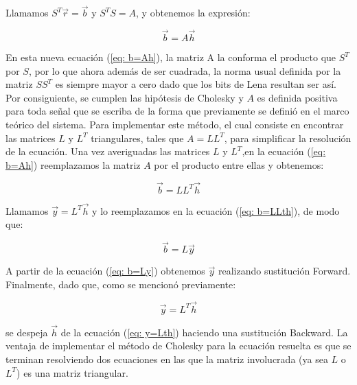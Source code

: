 Llamamos  $S^T \vec{r} = \vec{b}$ y  $S^T S = A$, y obtenemos la expresi\'on:

\begin{equation} 
\vec{b} = A \vec{h} 
\label{eq: b=Ah} 
\end{equation} 

En esta nueva ecuaci\'on (\ref{eq: b=Ah}), la matriz A la conforma el producto que $S^T$ por $S$, por lo que ahora además de ser cuadrada, la norma usual definida por la matriz $S S^T$ es siempre mayor a cero dado que los bits de Lena resultan ser as\'i. Por consiguiente, se cumplen las hipótesis de Cholesky y $A$ es definida positiva para toda señal que se escriba de la forma que previamente se definió en el marco teórico del sistema. Para implementar este m\'etodo, el cual consiste en encontrar las matrices $L$ y $L^T$ triangulares, tales que $A = L L^T$, para simplificar la resoluci\'on de la ecuaci\'on. Una vez averiguadas las matrices  $L$ y $L^T$,en la ecuaci\'on (\ref{eq: b=Ah}) reemplazamos la matriz $A$ por el producto entre ellas y obtenemos:

\begin{equation} 
\vec{b} = L L^T \vec{h} 
\label{eq: b=LLth}
\end{equation} 

Llamamos $\vec{y} = L^T \vec{h}$ y lo reemplazamos en la ecuaci\'on (\ref{eq: b=LLth}), de modo que:

\begin{equation} 
\vec{b} = L \vec{y}
\label{eq: b=Ly}
\end{equation} 

A partir de la ecuaci\'on (\ref{eq: b=Ly}) obtenemos $ \vec{y}$ realizando sustituci\'on Forward. Finalmente, dado que, como se mencion\'o previamente:

 \begin{equation} 
\vec{y} = L^T \vec{h} 
\label{eq: y=Lth}
\end{equation}

se despeja $\vec{h}$ de la ecuaci\'on (\ref{eq: y=Lth}) haciendo una sustituci\'on Backward. La ventaja de implementar el m\'etodo de Cholesky para la ecuaci\'on resuelta es que se terminan resolviendo dos ecuaciones en las que la matriz involucrada (ya sea $L$ o $L^T$) es una matriz triangular.

